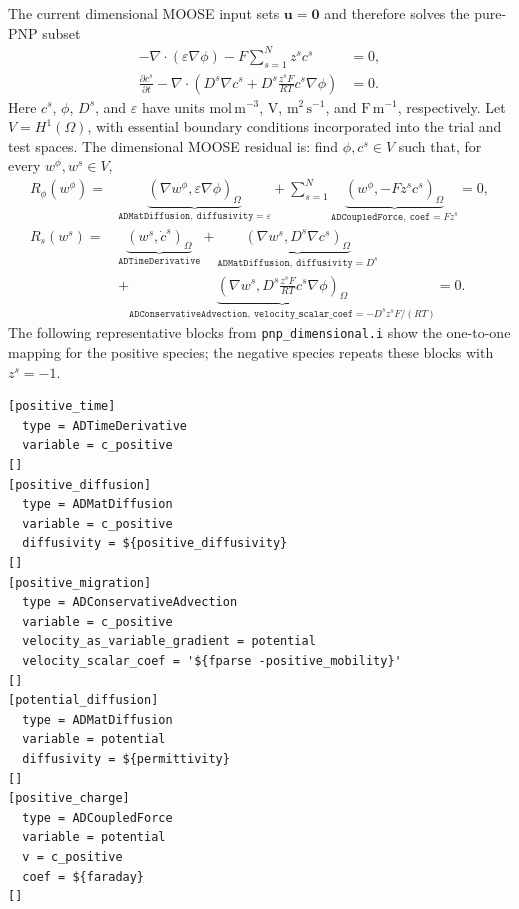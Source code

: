 \documentclass[3p,times]{elsarticle}
\begin{document}
The current dimensional MOOSE input sets $\boldsymbol{u}=\boldsymbol{0}$ and therefore solves the pure-PNP subset
\begin{align}
  -\nabla\cdot(\varepsilon\nabla\phi)-F\sum_{s=1}^{N}z^s c^s &=0,
  \label{eq:pnp_dim_poisson_strong}\\
  \frac{\partial c^s}{\partial t}-\nabla\cdot\left(D^s\nabla c^s+D^s\frac{z^sF}{RT}c^s\nabla\phi\right)&=0.
  \label{eq:pnp_dim_np_strong}
\end{align}
Here $c^s$, $\phi$, $D^s$, and $\varepsilon$ have units $\mathrm{mol\,m^{-3}}$, $\mathrm{V}$, $\mathrm{m^2\,s^{-1}}$, and $\mathrm{F\,m^{-1}}$, respectively. Let $V=H^1(\Omega)$, with essential boundary conditions incorporated into the trial and test spaces. The dimensional MOOSE residual is: find $\phi,c^s\in V$ such that, for every $w^\phi,w^s\in V$,
\begin{align}
  R_\phi(w^\phi)={}&\underbrace{\left(\nabla w^\phi,\varepsilon\nabla\phi\right)_\Omega}_{\texttt{ADMatDiffusion},\ \texttt{diffusivity}=\varepsilon}+\sum_{s=1}^{N}\underbrace{\left(w^\phi,-Fz^s c^s\right)_\Omega}_{\texttt{ADCoupledForce},\ \texttt{coef}=Fz^s}=0,
  \label{eq:pnp_dim_poisson_moose}\\
  R_s(w^s)={}&\underbrace{\left(w^s,\dot{c}^s\right)_\Omega}_{\texttt{ADTimeDerivative}}+\underbrace{\left(\nabla w^s,D^s\nabla c^s\right)_\Omega}_{\texttt{ADMatDiffusion},\ \texttt{diffusivity}=D^s}\nonumber\\
  &+\underbrace{\left(\nabla w^s,D^s\frac{z^sF}{RT}c^s\nabla\phi\right)_\Omega}_{\texttt{ADConservativeAdvection},\ \texttt{velocity\_scalar\_coef}=-D^sz^sF/(RT)}=0.
  \label{eq:pnp_dim_species_moose}
\end{align}
The following representative blocks from \texttt{pnp\_dimensional.i} show the one-to-one mapping for the positive species; the negative species repeats these blocks with $z^s=-1$.
\begin{lstlisting}[basicstyle=\ttfamily\small,columns=fullflexible]
[positive_time]
  type = ADTimeDerivative
  variable = c_positive
[]
[positive_diffusion]
  type = ADMatDiffusion
  variable = c_positive
  diffusivity = ${positive_diffusivity}
[]
[positive_migration]
  type = ADConservativeAdvection
  variable = c_positive
  velocity_as_variable_gradient = potential
  velocity_scalar_coef = '${fparse -positive_mobility}'
[]
[potential_diffusion]
  type = ADMatDiffusion
  variable = potential
  diffusivity = ${permittivity}
[]
[positive_charge]
  type = ADCoupledForce
  variable = potential
  v = c_positive
  coef = ${faraday}
[]
\end{lstlisting}
\end{document}
